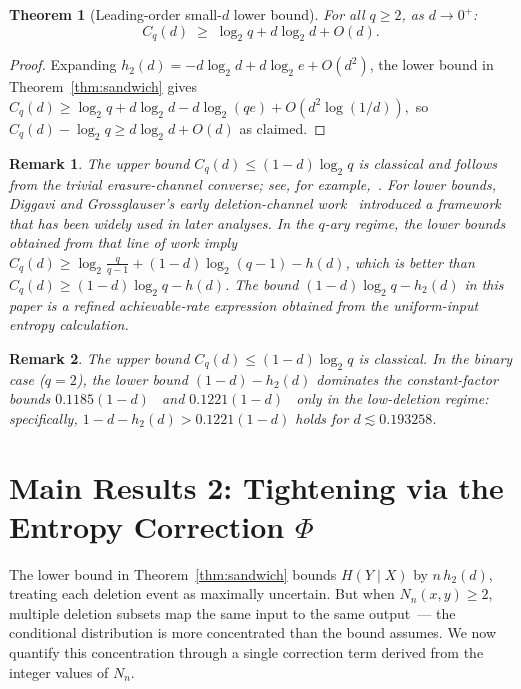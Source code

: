 \documentclass[conference]{IEEEtran}
\newtheorem{theorem}{Theorem}
\newtheorem{remark}{Remark}
\begin{document}
\begin{theorem}[Leading-order small-$d$ lower bound]
\label{thm:smalld}
For all $q\ge 2$, as $d\to 0^+$:
\begin{equation}
  C_q(d)\;\ge\;\log_2 q+d\log_2 d+O(d).
  \label{eq:smalld}
\end{equation}
\end{theorem}

\begin{proof}
Expanding $h_2(d)=-d\log_2 d+d\log_2 e+O(d^2)$, the lower bound in
Theorem~\ref{thm:sandwich} gives
\(
C_q(d)\ge\log_2 q+d\log_2 d-d\log_2(qe)+O(d^2\log(1/d)),
\)
so $C_q(d)-\log_2 q\ge d\log_2 d+O(d)$ as claimed.
\end{proof}


\begin{remark}
The upper bound \(C_q(d)\le (1-d)\log_2 q\) is classical and follows from the
trivial erasure-channel converse; see, for example,~\cite{mitzenmacher2009,rahmati2014}.
For lower bounds, Diggavi and Grossglauser's early deletion-channel work~\cite{diggavi2001}
introduced a framework that has been widely used in later analyses.
In the $q$-ary regime, the lower bounds obtained from that line of work imply
\(
C_q(d)\ge \log_2 \tfrac{q}{q-1}+(1-d)\log_2 (q-1)-h(d)
\), which is better than \(C_q(d)\ge (1-d)\log_2 q-h(d)\).
The bound \((1-d)\log_2 q-h_2(d)\) in this paper is a refined achievable-rate
expression obtained from the uniform-input entropy calculation.
\end{remark}


\begin{remark}
The upper bound $C_q(d)\le(1-d)\log_2 q$ is classical.
In the binary case ($q=2$), the lower bound $(1-d)-h_2(d)$
dominates the constant-factor bounds $0.1185(1-d)$~\cite{drinea2007}
and $0.1221(1-d)$~\cite{rubinstein2023} only in the low-deletion
regime: specifically, $1-d-h_2(d)>0.1221(1-d)$ holds for
$d\lesssim 0.193258$.
\end{remark}


\section{Main Results 2: Tightening via the Entropy Correction $\Phi$}
\label{sec:tighter}

The lower bound in Theorem~\ref{thm:sandwich} bounds $H(Y\mid X)$ by
$n\,h_2(d)$, treating each deletion event as maximally uncertain.
But when $N_n(x,y)\ge 2$, multiple deletion subsets map the same
input to the same output~--- the conditional distribution is more
concentrated than the bound assumes.  We now quantify this
concentration through a single correction term derived from the
integer values of $N_n$.
\end{document}
